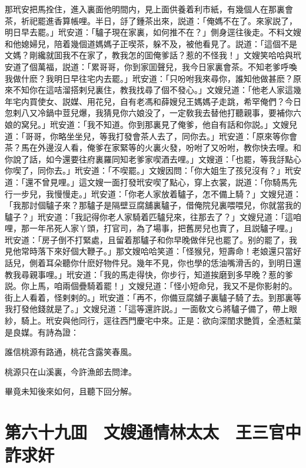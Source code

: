 那玳安把馬拴住，進入裏面他明間内，見上面供養着利市紙，有幾個人在那裏會茶，祈祀罷進香算帳哩。半日，㧱了鍾茶出來，説道：「俺媽不在了。來家説了，明日早去罷。」玳安道：「驢子現在家裏，如何推不在？」側身逕往後走。不料文嫂和他媳婦兒，陪着幾個道媽媽子正喫茶，躲不及，被他看見了。説道：「這個不是文媽？剛纔就囬我不在家了，教我怎的囬俺爹話？惹的不怪我！」文嫂笑哈哈與玳安道了個萬福，説道：「累哥哥，你到家囬聲兒，我今日家裏會茶。不知老爹呼喚我做什麽？我明日早往宅内去罷。」玳安道：「只吩咐我來尋你，誰知他做甚麽？原來不知你在這咭溜搭剌兒裏住，教我找尋了個不發心。」文嫂兒道：「他老人家這幾年宅内買使女、説媒、用花兒，自有老馮和薛嫂兒王媽媽子走跳，希罕俺們？今日忽剌八又冷鍋中荳兒爆，我猜見你六娘没了，一定敎我去替他打聽親事，要補你六娘的窝兒。」玳安道：「我不知道。你到那裏見了俺爹，他自有話和你説。」文嫂兒道：「哥哥，你略坐坐兒，等我打發會茶人去了，同你去。」玳安道：「原來等你會茶？馬在外邊沒人看，俺爹在家緊等的火裏火發，吩咐了又吩咐，教你快去哩。和你說了話，如今還要往府裏羅同知老爹家喫酒去哩。」文嫂道：「也罷，等我㧱點心你喫了，同你去。」玳安道：「不喫罷。」文嫂因問：「你大姐生了孩兒沒有？」玳安道：「還不曾見哩。」這文嫂一面打發玳安喫了點心，穿上衣裳，説道：「你騎馬先行一步兒，我慢慢走。」玳安道：「你老人家放着驢子，怎不備上騎？」文嫂兒道：「我那討個驢子來？那驢子是隔壁豆腐舖裏驢子，借俺院兒裏喂喂兒，你就當我的驢子？」玳安道：「我記得你老人家騎着匹驢兒來，往那去了？」文嫂兒道：「這咱哩，那一年吊死人家丫頭，打官司，為了場事，把舊房兒也賣了，且説驢子哩。」玳安道：「房子倒不打緊處，且留着那驢子和你早晚做伴兒也罷了。别的罷了，我見他常時落下來好個大鞭子。」那文嫂哈哈笑道：「怪猴兒，短壽命！老娘還只當好話兒，側着耳朵聽你什麽好物件兒。幾年不見，你也學的恁油嘴滑舌的，到明日還教我尋親事哩。」玳安道：「我的馬走得快，你步行，知道挨磨到多早晚？惹的爹説。你上馬，咱兩個疊騎着罷！」文嫂兒道：「怪小短命兒，我又不是你影射的。街上人看着，怪剌剌的。」玳安道：「再不，你備豆腐舖子裏驢子騎了去。到那裏等我打發他錢就是了。」文嫂兒道：「這等還許説。」一面敎文ら將驢子備了，帶上眼紗，騎上。玳安與他同行，逕往西門慶宅中來。正是：欲向深閨求艷質，全憑紅葉是良媒。有詩為證：

誰信桃源有路通，桃花含露笑春風。

桃源只在山溪裏，今許漁郎去問津。

畢竟未知後來如何，且聽下回分解。

\chapter*{第六十九囬　文嫂通情林太太　王三官中詐求奸}

